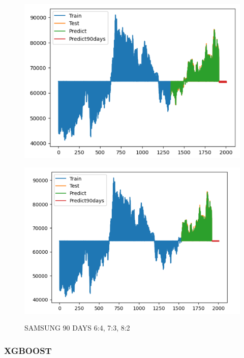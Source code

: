 \documentclass{article}
\begin{document}
\begin{multicols}{2}
\begin{figure}[H]
\begin{minipage}{0.15\textwidth}
    \label{fig:1}
    \end{minipage}%
    \begin{minipage}{0.15\textwidth}
    \centering
    \includegraphics[width=1\textwidth]{Image/GradientBoosting/SAMSUNG_90_7_3_GradientBoostingRegressor.png}
  
    \label{fig:2}
    \end{minipage}%
    \begin{minipage}{0.15\textwidth}
    \centering
    \includegraphics[width=1\textwidth]{Image/GradientBoosting/SAMSUNG_90_8_2_GradientBoostingRegressor.png}

    \label{fig:3}
    \end{minipage}
    \caption{SAMSUNG 90 DAYS  6:4, 7:3, 8:2 }
\end{figure} 

\subsubsection{XGBOOST}



\end{multicols}
\end{document}
